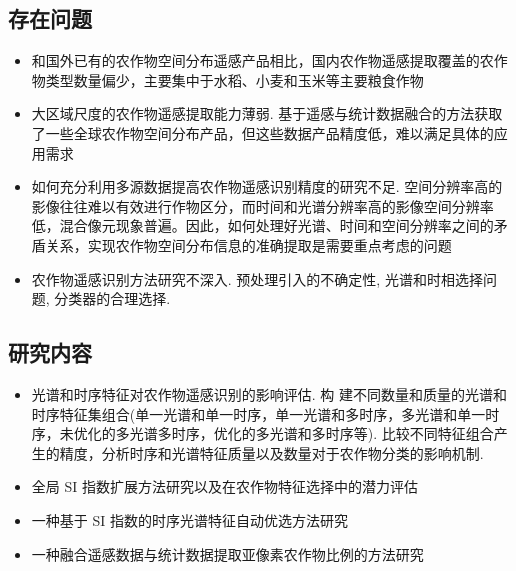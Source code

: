 \subsection{存在问题}
\begin{itemize}
    \item 和国外已有的农作物空间分布遥感产品相比，国内农作物遥感提取覆盖的农作物类型数量偏少，主要集中于水稻、小麦和玉米等主要粮食作物
    \item 大区域尺度的农作物遥感提取能力薄弱. 基于遥感与统计数据融合的方法获取了一些全球农作物空间分布产品，但这些数据产品精度低，难以满足具体的应用需求
    \item 如何充分利用多源数据提高农作物遥感识别精度的研究不足. 空间分辨率高的影像往往难以有效进行作物区分，而时间和光谱分辨率高的影像空间分辨率低，混合像元现象普遍。因此，如何处理好光谱、时间和空间分辨率之间的矛盾关系，实现农作物空间分布信息的准确提取是需要重点考虑的问题
    \item 农作物遥感识别方法研究不深入. 预处理引入的不确定性, 光谱和时相选择问题, 分类器的合理选择.
\end{itemize}

\subsection{研究内容}
\begin{itemize}
    \item 光谱和时序特征对农作物遥感识别的影响评估. 构
    建不同数量和质量的光谱和时序特征集组合(单一光谱和单一时序，单一光谱和多时序，多光谱和单一时序，未优化的多光谱多时序，优化的多光谱和多时序等). 比较不同特征组合产生的精度，分析时序和光谱特征质量以及数量对于农作物分类的影响机制.
    \item 全局 SI 指数扩展方法研究以及在农作物特征选择中的潜力评估
    \item 一种基于 SI 指数的时序光谱特征自动优选方法研究  
    \item 一种融合遥感数据与统计数据提取亚像素农作物比例的方法研究
\end{itemize}





